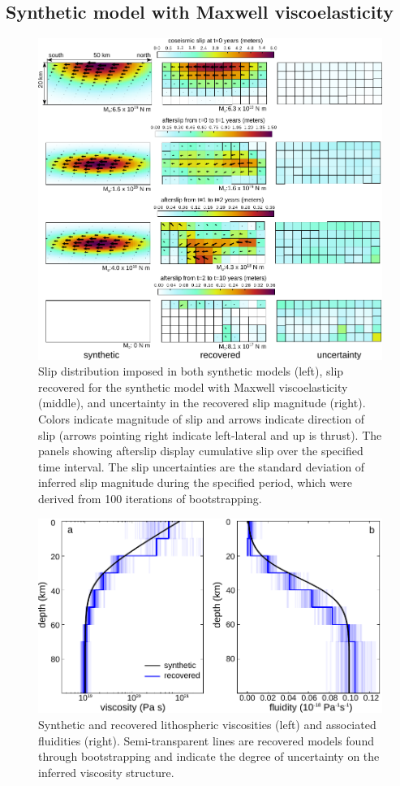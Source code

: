 \subsection{Synthetic model with Maxwell viscoelasticity}\label{ch2:sec:MaxModel}

\begin{figure}
\includegraphics{ch2/figures/Fig3.pdf}
\caption{Slip distribution imposed in both synthetic models (left),
slip recovered for the synthetic model with Maxwell viscoelasticity
(middle), and uncertainty in the recovered slip magnitude (right).
Colors indicate magnitude of slip and arrows indicate direction of
slip (arrows pointing right indicate left-lateral and up is thrust).
The panels showing afterslip display cumulative slip over the
specified time interval.  The slip uncertainties are the standard
deviation of inferred slip magnitude during the specified period,
which were derived from 100 iterations of bootstrapping.}
\label{ch2:fig:3}
\end{figure}

\begin{figure}
\includegraphics{ch2/figures/Fig4.pdf}
\caption{Synthetic and recovered lithospheric viscosities (left) and
associated fluidities (right).  Semi-transparent lines are recovered
models found through bootstrapping and indicate the degree of
uncertainty on the inferred viscosity structure.}
\label{ch2:fig:4}
\end{figure}

